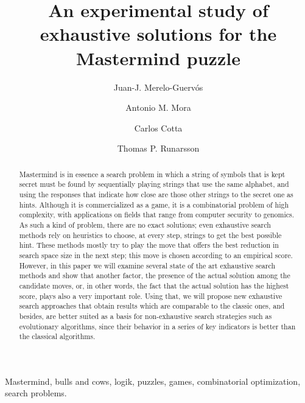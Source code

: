 \documentclass[preprint,12pt]{elsarticle}
\begin{document}
\begin{frontmatter}

\title{An experimental study of exhaustive solutions for the Mastermind puzzle}

\author[ugr,citic]{Juan-J. Merelo-Guerv\'os}
\author[ugr,citic]{Antonio M. Mora}
\author[uma]{Carlos Cotta}
\author[hi]{Thomas P. Runarsson}
\address[ugr]{Dept. of Computer Architecture and Technology,
  University of Granada, Spain, \\ email: \{jmerelo,amorag\}@geneura.ugr.es}
\address[citic]{CITIC, \url{http://citic.ugr.es}}
\address[uma]{ Dept. of Languages and Computer
Sciences, University of M\'alaga, \\ email: ccottap@lcc.uma.es}
\address[hi]{School of Engineering and Natural Sciences, University of Iceland,\\ email: tpr@hi.is }

\begin{abstract}
Mastermind is in essence a search problem in which a string of symbols that is kept secret must be
found by sequentially playing strings that use the same alphabet, and using the responses
that indicate how close are those other strings to the secret one as
hints. Although it is commercialized as a game, it is a combinatorial 
problem of high complexity, with applications on fields that range
from computer security to genomics. As such a kind of problem, there are no
exact solutions; even exhaustive search methods rely on heuristics to
choose, at every step, strings to get the best possible hint. These
methods mostly try to play the move that offers the best reduction in
search space size in the next step; this move is chosen according to an empirical score. However, in this paper we will examine several state of the art 
exhaustive search methods and show that another factor, the presence of the
actual solution among the candidate moves, or, in other words, the
fact that the actual solution has the highest score, plays also a very important
role. Using that, we will propose new exhaustive search approaches 
that obtain results which are comparable to the classic ones, and
besides, are better suited as a basis for non-exhaustive search
strategies such as evolutionary algorithms, since their behavior in a
series of key indicators is better than the classical algorithms. 

\end{abstract}

\begin{keyword}
Mastermind, bulls and cows, logik, puzzles, games, combinatorial
optimization, search problems.
\end{keyword}

\end{frontmatter}
\end{document}
